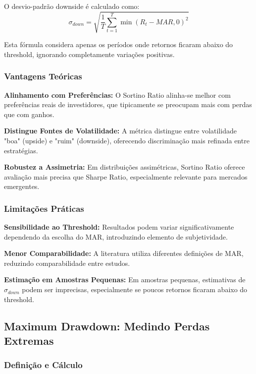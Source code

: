 O desvio-padrão downside é calculado como:
\begin{equation}
\sigma_{down} = \sqrt{\frac{1}{T} \sum_{t=1}^{T} \min(R_t - MAR, 0)^2}
\end{equation}

Esta fórmula considera apenas os períodos onde retornos ficaram abaixo do threshold, ignorando completamente variações positivas.

\subsubsection{Vantagens Teóricas}

\textbf{Alinhamento com Preferências:} O Sortino Ratio alinha-se melhor com preferências reais de investidores, que tipicamente se preocupam mais com perdas que com ganhos.

\textbf{Distingue Fontes de Volatilidade:} A métrica distingue entre volatilidade "boa" (upside) e "ruim" (downside), oferecendo discriminação mais refinada entre estratégias.

\textbf{Robustez a Assimetria:} Em distribuições assimétricas, Sortino Ratio oferece avaliação mais precisa que Sharpe Ratio, especialmente relevante para mercados emergentes.

\subsubsection{Limitações Práticas}

\textbf{Sensibilidade ao Threshold:} Resultados podem variar significativamente dependendo da escolha do MAR, introduzindo elemento de subjetividade.

\textbf{Menor Comparabilidade:} A literatura utiliza diferentes definições de MAR, reduzindo comparabilidade entre estudos.

\textbf{Estimação em Amostras Pequenas:} Em amostras pequenas, estimativas de $\sigma_{down}$ podem ser imprecisas, especialmente se poucos retornos ficaram abaixo do threshold.

\subsection{Maximum Drawdown: Medindo Perdas Extremas}

\subsubsection{Definição e Cálculo}

